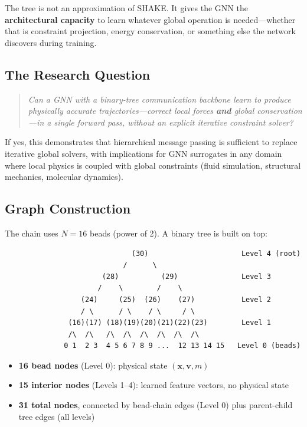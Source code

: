 \documentclass[11pt,a4paper]{article}
\begin{document}
The tree is not an approximation of SHAKE. It gives the GNN the
\textbf{architectural capacity} to learn whatever global operation is
needed---whether that is constraint projection, energy conservation, or
something else the network discovers during training.

\subsection{The Research Question}

\begin{quote}
\textit{Can a GNN with a binary-tree communication backbone learn to produce
physically accurate trajectories---correct local forces \textbf{and} global
conservation---in a single forward pass, without an explicit iterative
constraint solver?}
\end{quote}

If yes, this demonstrates that hierarchical message passing is sufficient to
replace iterative global solvers, with implications for GNN surrogates in any
domain where local physics is coupled with global constraints (fluid
simulation, structural mechanics, molecular dynamics).

\subsection{Graph Construction}

The chain uses $N = 16$ beads (power of 2). A binary tree is built on top:

\begin{verbatim}
                              (30)                      Level 4 (root)
                            /      \
                       (28)          (29)               Level 3
                      /    \        /    \
                  (24)     (25)  (26)    (27)           Level 2
                  / \      / \    / \     / \
               (16)(17) (18)(19)(20)(21)(22)(23)        Level 1
               /\  /\   /\  /\  /\  /\  /\  /\
              0 1  2 3  4 5 6 7 8 9 ...  12 13 14 15   Level 0 (beads)
\end{verbatim}

\begin{itemize}
    \item \textbf{16 bead nodes} (Level 0): physical state
          $(\mathbf{x}, \mathbf{v}, m)$
    \item \textbf{15 interior nodes} (Levels 1--4): learned feature vectors,
          no physical state
    \item \textbf{31 total nodes}, connected by bead-chain edges (Level 0)
          plus parent-child tree edges (all levels)
\end{itemize}
\end{document}
